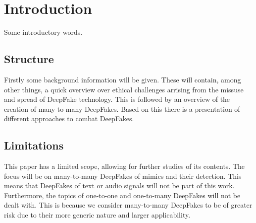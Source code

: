 \section{Introduction}
Some introductory words.

\subsection{Structure}
Firstly some background information will be given. These will contain, among 
other things, a quick overview over ethical challenges arrising from the missuse
and spread of DeepFake technology.
This is followed by an overview of the creation of many-to-many DeepFakes.
Based on this there is a presentation of different approaches to combat DeepFakes.

\subsection{Limitations}
This paper has a limited scope, allowing for further studies of its contents.
The focus will be on many-to-many DeepFakes of mimics and their detection.
This means that DeepFakes of text or audio signals will not be part of this work.
Furthermore, the topics of one-to-one and one-to-many DeepFakes will not be
dealt with. This is because we consider many-to-many DeepFakes to be of greater
risk due to their more generic nature and larger applicability.